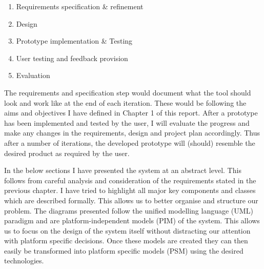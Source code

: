 \begin{enumerate}
	\item Requirements specification \& refinement
	\item Design
	\item Prototype implementation \& Testing
	\item User testing and feedback provision
	\item Evaluation
\end{enumerate}
The requirements and specification step would document what the tool should look and work like at the end of each iteration. These would be following the aims and objectives I have defined in Chapter 1 of this report. After a prototype has been implemented and tested by the user, I will evaluate the progress and make any changes in the requirements, design and project plan accordingly. Thus after a number of iterations, the developed prototype will (should) resemble the desired product as required by the user.

In the below sections I have presented the system at an abstract level. This follows from careful analysis and consideration of the requirements stated in the previous chapter. I have tried to highlight all major key components and classes which are described formally. This allows us to better organise and structure our problem. The diagrams presented follow the unified modelling language (UML) paradigm \cite{uml} and are platform-independent models (PIM) of the system. This allows us to focus on the design of the system itself without distracting our attention with platform specific decisions. Once these models are created they can then easily be transformed into platform specific models (PSM) using the desired technologies.

